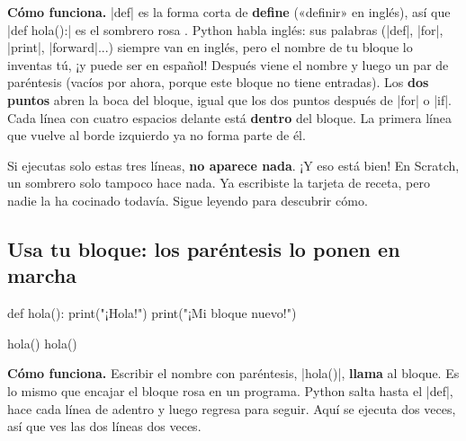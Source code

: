 \textbf{Cómo funciona.} \py|def| es la forma corta de \textbf{define} («definir» en inglés), así que \py|def hola():| es el sombrero rosa . Python habla inglés: sus palabras (\py|def|, \py|for|, \py|print|, \py|forward|...) siempre van en inglés, pero el nombre de tu bloque lo inventas tú, ¡y puede ser en español! Después viene el nombre y luego un par de paréntesis (vacíos por ahora, porque este bloque no tiene entradas). Los \textbf{dos puntos} abren la boca del bloque, igual que los dos puntos después de \py|for| o \py|if|. Cada línea con cuatro espacios delante está \textbf{dentro} del bloque. La primera línea que vuelve al borde izquierdo ya no forma parte de él.

\begin{think}
Si ejecutas solo estas tres líneas, \textbf{no aparece nada}. ¡Y eso está bien! En Scratch, un sombrero  solo tampoco hace nada. Ya escribiste la tarjeta de receta, pero nadie la ha cocinado todavía. Sigue leyendo para descubrir cómo.
\end{think}

\subsection*{Usa tu bloque: los paréntesis lo ponen en marcha}

\begin{tcbraster}[raster columns=2, raster equal height=rows, raster column skip=12pt, raster valign=center, raster force size=false, raster column 1/.style={add to width=-2cm}, raster column 2/.style={add to width=2cm}]
\begin{tcolorbox}[colback=white, colframe=white, boxrule=0pt, valign=center]
\begin{scratch}
\end{scratch}
\end{tcolorbox}
\begin{code}
def hola():
    print("¡Hola!")
    print("¡Mi bloque nuevo!")

hola()
hola()
\end{code}
\end{tcbraster}

\textbf{Cómo funciona.} Escribir el nombre con paréntesis, \py|hola()|, \textbf{llama} al bloque. Es lo mismo que encajar el bloque rosa  en un programa. Python salta hasta el \py|def|, hace cada línea de adentro y luego regresa para seguir. Aquí se ejecuta dos veces, así que ves las dos líneas dos veces.

